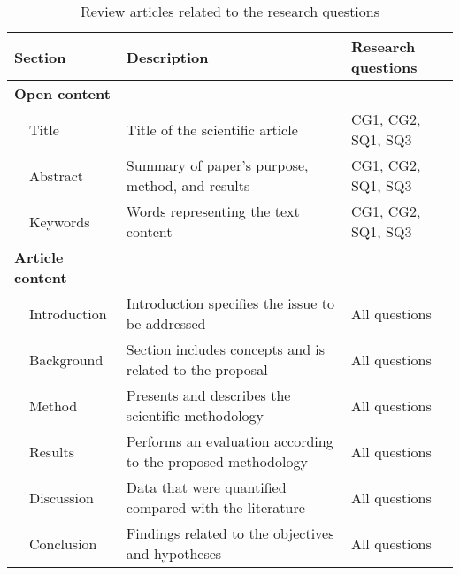 \begin{table*}[tb]
\centering
\renewcommand{\arraystretch}{1.5}
\caption{Review articles related to the research questions}
\label{table_extraction}
\begin{tabularx}{\textwidth}{ll@{\hspace{8em}}l@{\hspace{1em}}l}
\hline
\multicolumn{2}{l}{Section} & Description & Research questions \\ \hline

\multicolumn{2}{l}{\textbf{Open content}} &  &  \\
 & Title & Title of the scientific article & CG1, CG2, SQ1, SQ3 \\
 & Abstract & Summary of paper’s purpose, method, and results & CG1, CG2, SQ1, SQ3 \\
 & Keywords & Words representing the text content & CG1, CG2, SQ1, SQ3 \\
 
\multicolumn{2}{l}{\textbf{Article content}} &  &  \\
 & Introduction & Introduction specifies the issue to be addressed & All questions \\
 & Background & Section includes concepts and is related to the proposal & All questions \\
 & Method & Presents and describes the scientific methodology & All questions \\
 & Results & Performs an evaluation according to the proposed methodology & All questions \\
 & Discussion & Data that were quantified compared with the literature & All questions \\
 & Conclusion & Findings related to the objectives and hypotheses & All questions \\ \hline
\end{tabularx}
\end{table*}